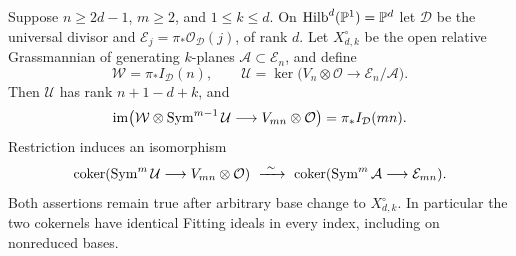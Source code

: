 \begin{theorem}\label{thm:conductor-reduction}
Suppose $n\ge2d-1$, $m\ge2$, and $1\le k\le d$. On
$\operatorname{Hilb}^d(\mathbb P^1)=\mathbb P^d$ let $\mathcal D$ be the
universal divisor and
$\mathcal E_j=\pi_*\mathcal O_{\mathcal D}(j)$, of rank $d$.
Let $X_{d,k}^\circ$ be the open relative Grassmannian of generating
$k$-planes $\mathcal A\subset\mathcal E_n$, and define
\[
 \mathcal W=\pi_*I_{\mathcal D}(n),\qquad
 \mathcal U=\ker\bigl(V_n\otimes\mathcal O
                      \longrightarrow\mathcal E_n/\mathcal A\bigr).
\]
Then $\mathcal U$ has rank $n+1-d+k$, and
\begin{equation}\label{eq:conductor-saturated-product}
 \operatorname{im}\bigl(\mathcal W\otimes\operatorname{Sym}^{m-1}\mathcal U
                         \longrightarrow V_{mn}\otimes\mathcal O\bigr)
       =\pi_*I_{\mathcal D}(mn).
\end{equation}
Restriction induces an isomorphism
\begin{equation}\label{eq:conductor-relative-cokernel}
 \operatorname{coker}(\operatorname{Sym}^m\mathcal U\longrightarrow V_{mn}\otimes\mathcal O)
 \ \xrightarrow{\ \sim\ }\
 \operatorname{coker}(\operatorname{Sym}^m\mathcal A\longrightarrow\mathcal E_{mn}).
\end{equation}
Both assertions remain true after arbitrary base change to
$X_{d,k}^\circ$. In particular the two cokernels have identical
Fitting ideals in every index, including on nonreduced bases.
\end{theorem}
